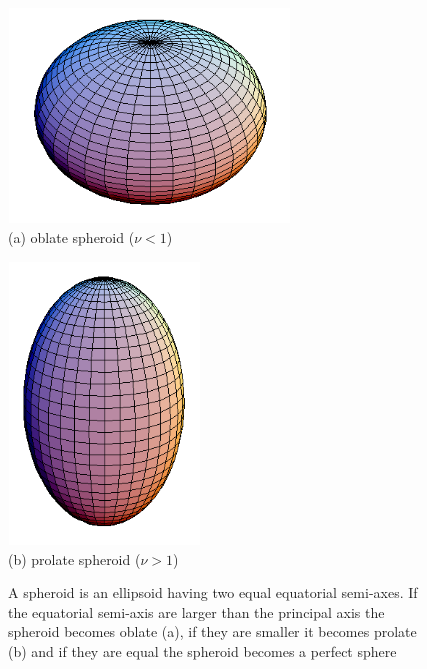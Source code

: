 \begin{figure}[htb]
\begin{center}
\begin{minipage}[b]{0.5\linewidth}
\begin{center}
\includegraphics[width=7.5cm,height=5.7cm]{../images/form_factor/Ellipsoid/OblateSpheroid.png} \\
(a) oblate spheroid ($\nu <1$)
\end{center}
\end{minipage}%
\begin{minipage}[b]{0.5\linewidth}
\begin{center}
\includegraphics[width=5.1cm,height=7.5cm]{../images/form_factor/Ellipsoid/ProlateSpheroid.png}\\
(b) prolate spheroid ($\nu >1$)
\end{center}
\end{minipage}
\end{center}
\caption{A spheroid is an ellipsoid having two equal equatorial semi-axes. If the equatorial
semi-axis are larger than the principal axis the spheroid becomes oblate (a), if they are smaller
it becomes prolate (b) and if they are equal the spheroid becomes a perfect sphere}
\label{prolate oblate}
\end{figure}

